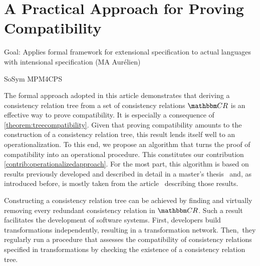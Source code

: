 \section{A Practical Approach for Proving Compatibility}
\label{chap:compatibility:practical_approach}

Goal: Applies formal framework for extensional specification to actual languages with intensional specification (MA Aurélien)

\begin{copiedFrom}{SoSym MPM4CPS}


The formal approach adopted in this article demonstrates that deriving a consistency relation tree from a set of consistency relations $\consistencyrelationset{CR}$ is an effective way to prove compatibility. It is especially a consequence of \autoref{theorem:treecompatibility}. 
Given that proving compatibility amounts to the construction of a consistency relation tree, this result lends itself well to an operationalization. To this end, we propose an algorithm that turns the proof of compatibility into an operational procedure. This constitutes our contribution \ref{contrib:operationalizedapproach}.
For the most part, this algorithm is based on results previously developed and described in detail in a master's thesis~\cite{pepin2019ma} and, as introduced before, is mostly taken from the article~ describing those results.

Constructing a consistency relation tree can be achieved by finding and virtually removing every redundant consistency relation in $\consistencyrelationset{CR}$. Such a result facilitates the development of software systems. First, developers build transformations independently, resulting in a transformation network. Then,~they regularly run a procedure that assesses the compatibility of consistency relations specified in transformations by checking the existence of a consistency relation tree.


\end{copiedFrom}
